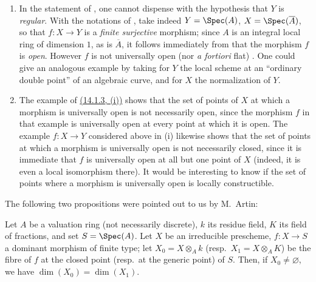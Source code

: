 \begin{remarks}[14.3.9]
\label{IV.14.3.9}
\begin{enumerate}[label=(\roman*)]
  \item In the statement of , one cannot dispense with the hypothesis that $Y$ is \emph{regular}.
  With the notations of , take indeed $Y=\Spec(A)$, $X=\Spec(\overline{A})$, so that $f:X\to Y$ is a \emph{finite surjective} morphism; since $A$ is an integral local ring of dimension $1$, as is $\overline{A}$, it follows immediately from  that the morphism $f$ is \emph{open}.
  However $f$ is not universally open (nor \emph{a fortiori} flat) .
  One could give an analogous example by taking for $Y$ the local scheme at an ``ordinary double point'' of an algebraic curve, and for $X$ the normalization of $Y$.

  \item The example of {\hyperlink{ega4.c04.item.14-1-3}{(14.1.3, (i))}} shows that the set of points of $X$ at which a morphism is universally open is not necessarily open, since the morphism $f$ in that example is universally open at every point at which it is open.
  The example $f:X\to Y$ considered above in (i) likewise shows that the set of points at which a morphism is universally open is not necessarily closed, since it is immediate that $f$ is universally open at all but one point of $X$ (indeed, it is even a local isomorphism there).
  It would be interesting to know if the set of points where a morphism is universally open is locally constructible.
\end{enumerate}
\end{remarks}

The following two propositions were pointed out to us by M.\ Artin:

\begin{lemma}[14.3.10]
\label{IV.14.3.10}
Let $A$ be a valuation ring (not necessarily discrete), $k$ its residue field, $K$ its field of fractions, and set $S=\Spec(A)$.
Let $X$ be an irreducible prescheme, $f:X\to S$ a dominant morphism of finite type; let $X_0=X\otimes_A k$ (resp.\ $X_1=X\otimes_A K$) be the fibre of $f$ at the closed point (resp.\ at the generic point) of $S$.
Then, if $X_0\neq\varnothing$, we have $\dim(X_0)=\dim(X_1)$.
\end{lemma}

